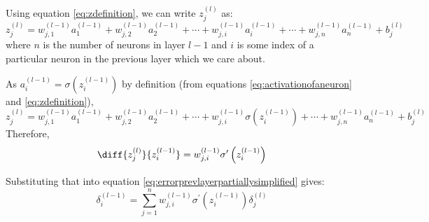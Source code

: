\documentclass[12pt]{report}
\begin{document}
Using equation \ref{eq:zdefinition}, we can write $z^{\left(l\right)}_j$ as:
\begin{equation}
    z^{\left(l\right)}_j=w^{\left(l-1\right)}_{j,1}a^{\left(l-1\right)}_1+w^{\left(l-1\right)}_{j,2}a^{\left(l-1\right)}_2+\cdots+w^{\left(l-1\right)}_{j,i}a^{\left(l-1\right)}_i+\cdots +w^{\left(l-1\right)}_{j,n}a^{\left(l-1\right)}_n+b^{\left(l\right)}_j
\end{equation}
where $n$ is the number of neurons in layer $l-1$ and $i$ is some index of a particular neuron in the previous layer which we care about.

As $a^{\left(l-1\right)}_i=\sigma \left(z^{\left(l-1\right)}_i\right)$ by definition (from equations \ref{eq:activationofaneuron} and \ref{eq:zdefinition}),
\begin{equation}
    z^{\left(l\right)}_j=w^{\left(l-1\right)}_{j,1}a^{\left(l-1\right)}_1+w^{\left(l-1\right)}_{j,2}a^{\left(l-1\right)}_2+\cdots+w^{\left(l-1\right)}_{j,i}\sigma \left(z^{\left(l-1\right)}_i\right)+\cdots +w^{\left(l-1\right)}_{j,n}a^{\left(l-1\right)}_n+b^{\left(l\right)}_j
\end{equation}
Therefore,
\begin{equation}
    \diff{z^{\left(l\right)}_j}{z^{\left(l-1\right)}_i}=w^{\left(l-1\right)}_{j,i}{\sigma}^{\prime} \left(z^{\left(l-1\right)}_i\right)
\end{equation}

Substituting that into equation \ref{eq:errorprevlayerpartiallysimplified} gives:
\begin{equation}\label{eq:deltalminus1componentform}
    {\delta}^{\left(l-1\right)}_i=\displaystyle\sum_{j=1}^{n}w^{\left(l-1\right)}_{j,i}{\sigma}^{\prime} \left(z^{\left(l-1\right)}_i\right){\delta}^{\left(l\right)}_j
\end{equation}
\end{document}
